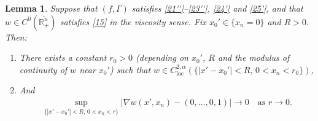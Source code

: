 \documentclass[12pt]{article}
\numberwithin{equation}{section}
\theoremstyle{plain}
\newtheorem{lem}[thm]{Lemma}
\theoremstyle{definition}
\begin{document}
\begin{lem}\label{17}
	Suppose that $(f,\Gamma)$ satisfies \eqref{21''}--\eqref{23''}, \eqref{24'} and \eqref{25'}, and that $w\in C^0(\overline{\mathbb{R}_+^n})$ satisfies \eqref{15} in the viscosity sense. Fix $x_0' \in \{x_n=0\}$ and $R>0$. Then:\smallskip
	\begin{enumerate}
		\item There exists a constant $r_0>0$ (depending on $x_0'$, $R$ and the modulus of continuity of $w$ near $x_0'$) such that $w\in C_{\operatorname{loc}}^{2,\alpha}(\{|x'-x_0'| < R,\,0<x_n < r_0\})$,\smallskip
		\item And
		\begin{align*}
		\sup_{\{|x'-x_0'| < R,\, 0<x_n < r\}}|\nabla w(x',x_n) - (0,\dots,0,1)| \rightarrow 0 \quad \text{as }r\rightarrow 0. 
		\end{align*}
	\end{enumerate}
\end{lem}
\end{document}
